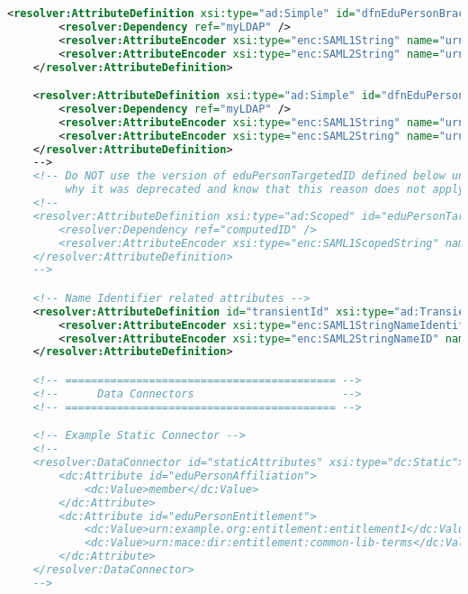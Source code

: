 \begin{lstlisting}[language=xml]
    <resolver:AttributeDefinition xsi:type="ad:Simple" id="dfnEduPersonBrachAndType" sourceAttributeID="dfnEduPersonBrachAndType">
        <resolver:Dependency ref="myLDAP" />
        <resolver:AttributeEncoder xsi:type="enc:SAML1String" name="urn:mace:dir:attribute-def:dfnEduPersonBrachAndType" />
        <resolver:AttributeEncoder xsi:type="enc:SAML2String" name="urn:oid:1.3.6.1.4.1.22177.400.1.1.3.10" friendlyName="dfnEduPersonBrachAndType" />
    </resolver:AttributeDefinition>

    <resolver:AttributeDefinition xsi:type="ad:Simple" id="dfnEduPersonFeaturesOfStudy" sourceAttributeID="dfnEduPersonFeaturesOfStudy">
        <resolver:Dependency ref="myLDAP" />
        <resolver:AttributeEncoder xsi:type="enc:SAML1String" name="urn:mace:dir:attribute-def:dfnEduPersonFeaturesOfStudy" />
        <resolver:AttributeEncoder xsi:type="enc:SAML2String" name="urn:oid:1.3.6.1.4.1.22177.400.1.1.3.11" friendlyName="dfnEduPersonFeaturesOfStudy" />
    </resolver:AttributeDefinition>
    -->
    <!-- Do NOT use the version of eduPersonTargetedID defined below unless you understand
         why it was deprecated and know that this reason does not apply to you. -->
    <!--
    <resolver:AttributeDefinition xsi:type="ad:Scoped" id="eduPersonTargetedID.old" scope="shib.lan" sourceAttributeID="computedID">
        <resolver:Dependency ref="computedID" />
        <resolver:AttributeEncoder xsi:type="enc:SAML1ScopedString" name="urn:mace:dir:attribute-def:eduPersonTargetedID" />
    </resolver:AttributeDefinition>
    -->

    <!-- Name Identifier related attributes -->
    <resolver:AttributeDefinition id="transientId" xsi:type="ad:TransientId">
        <resolver:AttributeEncoder xsi:type="enc:SAML1StringNameIdentifier" nameFormat="urn:mace:shibboleth:1.0:nameIdentifier"/>
        <resolver:AttributeEncoder xsi:type="enc:SAML2StringNameID" nameFormat="urn:oasis:names:tc:SAML:2.0:nameid-format:transient"/>
    </resolver:AttributeDefinition>

    <!-- ========================================== -->
    <!--      Data Connectors                       -->
    <!-- ========================================== -->

    <!-- Example Static Connector -->
    <!--
    <resolver:DataConnector id="staticAttributes" xsi:type="dc:Static">
        <dc:Attribute id="eduPersonAffiliation">
            <dc:Value>member</dc:Value>
        </dc:Attribute>
        <dc:Attribute id="eduPersonEntitlement">
            <dc:Value>urn:example.org:entitlement:entitlement1</dc:Value>
            <dc:Value>urn:mace:dir:entitlement:common-lib-terms</dc:Value>
        </dc:Attribute>
    </resolver:DataConnector>
    -->


\end{lstlisting}
